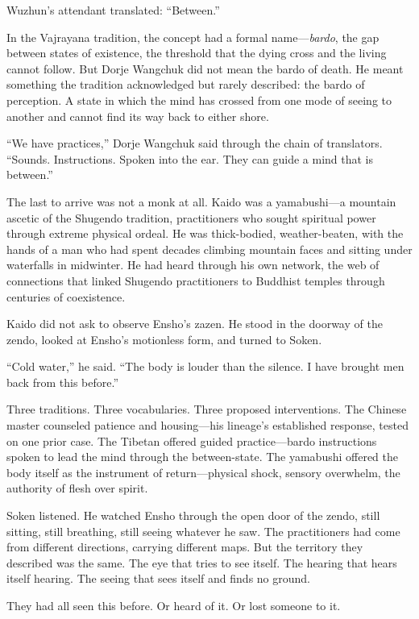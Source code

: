 Wuzhun's attendant translated: ``Between.''

In the Vajrayana tradition, the concept had a formal name---\emph{bardo}, the gap between states of existence, the threshold that the dying cross and the living cannot follow. But Dorje Wangchuk did not mean the bardo of death. He meant something the tradition acknowledged but rarely described: the bardo of perception. A state in which the mind has crossed from one mode of seeing to another and cannot find its way back to either shore.

``We have practices,'' Dorje Wangchuk said through the chain of translators. ``Sounds. Instructions. Spoken into the ear. They can guide a mind that is between.''

The last to arrive was not a monk at all. Kaido was a yamabushi---a mountain ascetic of the Shugendo tradition, practitioners who sought spiritual power through extreme physical ordeal. He was thick-bodied, weather-beaten, with the hands of a man who had spent decades climbing mountain faces and sitting under waterfalls in midwinter. He had heard through his own network, the web of connections that linked Shugendo practitioners to Buddhist temples through centuries of coexistence.

Kaido did not ask to observe Ensho's zazen. He stood in the doorway of the zendo, looked at Ensho's motionless form, and turned to Soken.

``Cold water,'' he said. ``The body is louder than the silence. I have brought men back from this before.''

Three traditions. Three vocabularies. Three proposed interventions. The Chinese master counseled patience and housing---his lineage's established response, tested on one prior case. The Tibetan offered guided practice---bardo instructions spoken to lead the mind through the between-state. The yamabushi offered the body itself as the instrument of return---physical shock, sensory overwhelm, the authority of flesh over spirit.

Soken listened. He watched Ensho through the open door of the zendo, still sitting, still breathing, still seeing whatever he saw. The practitioners had come from different directions, carrying different maps. But the territory they described was the same. The eye that tries to see itself. The hearing that hears itself hearing. The seeing that sees itself and finds no ground.

They had all seen this before. Or heard of it. Or lost someone to it.

